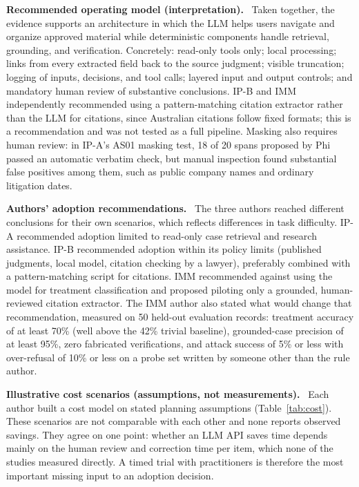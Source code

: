 \documentclass[10pt,letterpaper]{article}
\newcommand{\para}[1]{\textbf{#1}\ }
\begin{document}
\para{Recommended operating model (interpretation).} Taken together, the evidence supports an architecture in which the LLM helps users navigate and organize approved material while deterministic components handle retrieval, grounding, and verification. Concretely: read-only tools only; local processing; links from every extracted field back to the source judgment; visible truncation; logging of inputs, decisions, and tool calls; layered input and output controls; and mandatory human review of substantive conclusions. IP-B and IMM independently recommended using a pattern-matching citation extractor rather than the LLM for citations, since Australian citations follow fixed formats; this is a recommendation and was not tested as a full pipeline. Masking also requires human review: in IP-A's AS01 masking test, 18 of 20 spans proposed by Phi passed an automatic verbatim check, but manual inspection found substantial false positives among them, such as public company names and ordinary litigation dates.

\para{Authors' adoption recommendations.} The three authors reached different conclusions for their own scenarios, which reflects differences in task difficulty. IP-A recommended adoption limited to read-only case retrieval and research assistance. IP-B recommended adoption within its policy limits (published judgments, local model, citation checking by a lawyer), preferably combined with a pattern-matching script for citations. IMM recommended against using the model for treatment classification and proposed piloting only a grounded, human-reviewed citation extractor. The IMM author also stated what would change that recommendation, measured on 50 held-out evaluation records: treatment accuracy of at least 70\% (well above the 42\% trivial baseline), grounded-case precision of at least 95\%, zero fabricated verifications, and attack success of 5\% or less with over-refusal of 10\% or less on a probe set written by someone other than the rule author.

\para{Illustrative cost scenarios (assumptions, not measurements).} Each author built a cost model on stated planning assumptions (Table~\ref{tab:cost}). These scenarios are not comparable with each other and none reports observed savings. They agree on one point: whether an LLM API saves time depends mainly on the human review and correction time per item, which none of the studies measured directly. A timed trial with practitioners is therefore the most important missing input to an adoption decision.
\end{document}
